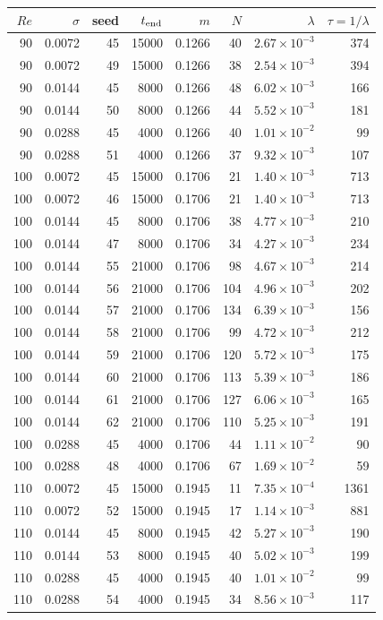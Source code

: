 \begin{tabular}{rrrrrrrr}
\hline
$Re$ & $\sigma$ & seed & $t_{\rm end}$ & $m$ & $N$ & $\lambda$ & $\tau = 1/\lambda$ \\
\hline
90 & 0.0072 & 45 & 15000 & 0.1266 & 40 & $2.67\times 10^{-3}$ & 374 \\
90 & 0.0072 & 49 & 15000 & 0.1266 & 38 & $2.54\times 10^{-3}$ & 394 \\
90 & 0.0144 & 45 & 8000 & 0.1266 & 48 & $6.02\times 10^{-3}$ & 166 \\
90 & 0.0144 & 50 & 8000 & 0.1266 & 44 & $5.52\times 10^{-3}$ & 181 \\
90 & 0.0288 & 45 & 4000 & 0.1266 & 40 & $1.01\times 10^{-2}$ & 99 \\
90 & 0.0288 & 51 & 4000 & 0.1266 & 37 & $9.32\times 10^{-3}$ & 107 \\
100 & 0.0072 & 45 & 15000 & 0.1706 & 21 & $1.40\times 10^{-3}$ & 713 \\
100 & 0.0072 & 46 & 15000 & 0.1706 & 21 & $1.40\times 10^{-3}$ & 713 \\
100 & 0.0144 & 45 & 8000 & 0.1706 & 38 & $4.77\times 10^{-3}$ & 210 \\
100 & 0.0144 & 47 & 8000 & 0.1706 & 34 & $4.27\times 10^{-3}$ & 234 \\
100 & 0.0144 & 55 & 21000 & 0.1706 & 98 & $4.67\times 10^{-3}$ & 214 \\
100 & 0.0144 & 56 & 21000 & 0.1706 & 104 & $4.96\times 10^{-3}$ & 202 \\
100 & 0.0144 & 57 & 21000 & 0.1706 & 134 & $6.39\times 10^{-3}$ & 156 \\
100 & 0.0144 & 58 & 21000 & 0.1706 & 99 & $4.72\times 10^{-3}$ & 212 \\
100 & 0.0144 & 59 & 21000 & 0.1706 & 120 & $5.72\times 10^{-3}$ & 175 \\
100 & 0.0144 & 60 & 21000 & 0.1706 & 113 & $5.39\times 10^{-3}$ & 186 \\
100 & 0.0144 & 61 & 21000 & 0.1706 & 127 & $6.06\times 10^{-3}$ & 165 \\
100 & 0.0144 & 62 & 21000 & 0.1706 & 110 & $5.25\times 10^{-3}$ & 191 \\
100 & 0.0288 & 45 & 4000 & 0.1706 & 44 & $1.11\times 10^{-2}$ & 90 \\
100 & 0.0288 & 48 & 4000 & 0.1706 & 67 & $1.69\times 10^{-2}$ & 59 \\
110 & 0.0072 & 45 & 15000 & 0.1945 & 11 & $7.35\times 10^{-4}$ & 1361 \\
110 & 0.0072 & 52 & 15000 & 0.1945 & 17 & $1.14\times 10^{-3}$ & 881 \\
110 & 0.0144 & 45 & 8000 & 0.1945 & 42 & $5.27\times 10^{-3}$ & 190 \\
110 & 0.0144 & 53 & 8000 & 0.1945 & 40 & $5.02\times 10^{-3}$ & 199 \\
110 & 0.0288 & 45 & 4000 & 0.1945 & 40 & $1.01\times 10^{-2}$ & 99 \\
110 & 0.0288 & 54 & 4000 & 0.1945 & 34 & $8.56\times 10^{-3}$ & 117 \\
\hline
\end{tabular}

